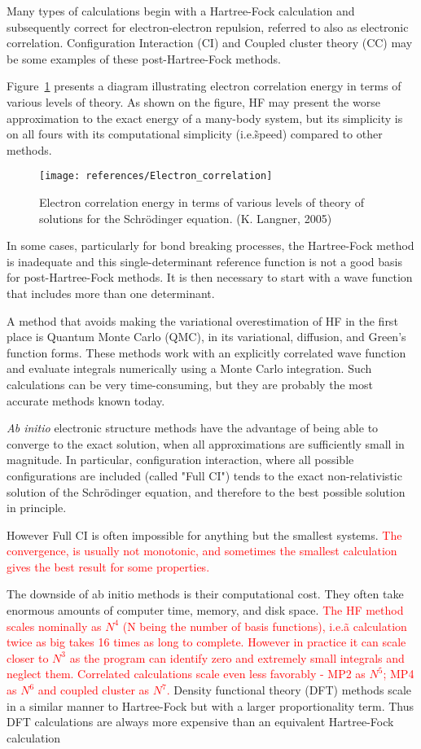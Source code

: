 Many types of calculations begin with a Hartree-Fock calculation and subsequently correct for electron-electron repulsion, referred to also as electronic correlation. Configuration Interaction (CI) and Coupled cluster theory (CC) may be some examples of these post-Hartree-Fock methods.

Figure~\ref{electronicCorrelation} presents a diagram illustrating electron correlation energy in terms of various levels of theory. As shown on the figure, HF may present the worse approximation to the exact energy of a many-body system, but its simplicity is on all fours with its computational simplicity (i.e.\~speed) compared to other methods.
\begin{figure}
\label{electronicCorrelation}
 \centering
\texttt{[image: references/Electron\_correlation]}	
 \caption{Electron correlation energy in terms of various levels of theory of solutions for the Schr\"{o}dinger equation.
(K. Langner, 2005)}
\end{figure}

In some cases, particularly for bond breaking processes, the Hartree-Fock method is inadequate and this single-determinant reference function is not a good basis for post-Hartree-Fock methods. It is then necessary to start with a wave function that includes more than one determinant.

A method that avoids making the variational overestimation of HF in the first place is Quantum Monte Carlo (QMC), in its variational, diffusion, and Green's function forms. These methods work with an explicitly correlated wave function and evaluate integrals numerically using a Monte Carlo integration. Such calculations can be very time-consuming, but they are probably the most accurate methods known today.

\textit{Ab initio} electronic structure methods have the advantage of being able to converge to the exact solution, when all approximations are sufficiently small in magnitude. In particular, configuration interaction, where all possible configurations are included (called "Full CI") tends to the exact non-relativistic solution of the Schr\"odinger equation, and therefore to the best possible solution in principle.

However Full CI is often impossible for anything but the smallest systems.
\textcolor{red}{The convergence, is usually not monotonic, and sometimes the smallest calculation gives the best result for some properties.}

The downside of ab initio methods is their computational cost. They often take enormous amounts of computer time, memory, and disk space. \textcolor{red}{The HF method scales nominally as $N^4$ (N being the number of basis functions), i.e.\~a calculation twice as big takes 16 times as long to complete. However in practice it can scale closer to $N^3$ as the program can identify zero and extremely small integrals and neglect them. Correlated calculations scale even less favorably - MP2 as $N^5$; MP4 as $N^6$ and coupled cluster as $N^7$.} Density functional theory (DFT) methods scale in a similar manner to Hartree-Fock but with a larger proportionality term. Thus DFT calculations are always more expensive than an equivalent Hartree-Fock calculation~\cite{wiki:abinitio} 

